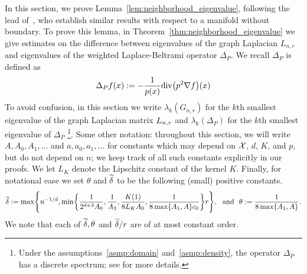 In this section, we prove Lemma~\ref{lem:neighborhood_eigenvalue}, following the lead of~\citet{burago2014,trillos2019,calder2019}, who establish similar results with respect to a manifold without boundary. To prove this lemma, in  Theorem~\ref{thm:neighborhood_eigenvalue} we give estimates on the difference between eigenvalues of the graph Laplacian $L_{n,r}$ and eigenvalues of the weighted Laplace-Beltrami operator $\Delta_P$. We recall $\Delta_P$ is defined as
\begin{equation*}
\Delta_Pf(x) := -\frac{1}{p(x)} \mathrm{div}\bigl(p^2\nabla f\bigr)(x)
\end{equation*}
To avoid confusion, in this section we write $\lambda_k(G_{n,r})$ for the $k$th smallest eigenvalue of the graph Laplacian matrix $L_{n,r}$ and $\lambda_k(\Delta_P)$ for the $k$th smallest eigenvalue of $\Delta_P$ \footnote{Under the assumptions~\ref{asmp:domain} and~\ref{asmp:density}, the operator $\Delta_P$ has a discrete spectrum; see \citet{garciatrillos18} for more details.}. Some other notation: throughout this section, we will write $A, A_0, A_1,\ldots$ and $a,a_0,a_1,\ldots$ for constants which may depend on $\mathcal{X}$, $d$, $K$, and $p$, but do not depend on $n$; we keep track of all such constants explicitly in our proofs. We let $L_K$ denote the Lipschitz constant of the kernel $K$. Finally, for notational ease we set $\theta$ and $\widetilde{\delta}$ to be the following (small) positive constants.
\begin{equation}
\label{asmp:smallness}
\widetilde{\delta} := \max\Biggl\{n^{-1/d}, \min\biggl\{\frac{1}{2^{d + 3}A_0}, \frac{1}{A_3}, \frac{K(1)}{8L_KA_0}, \frac{1}{8\max\{A_1,A\}c_0}\biggr\}r\Biggr\},~~\textrm{and}~~
\theta := \frac{1}{8\max\{A_1,A\}}.
\end{equation} 
We note that each of $\widetilde{\delta}, \theta$ and $\widetilde{\delta}/r$ are of at most constant order. 

